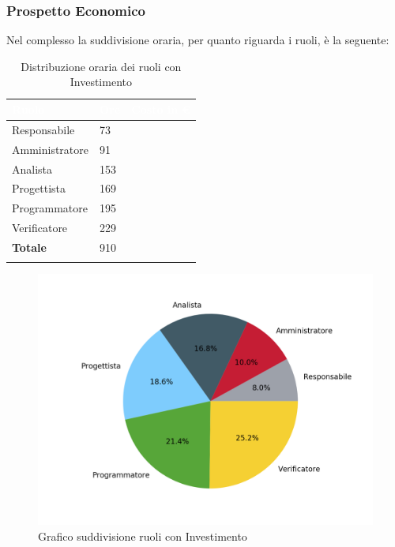 \newpage

\subsubsection{Prospetto Economico}
Nel complesso la suddivisione oraria, per quanto riguarda i ruoli, è la seguente: 


\begin{longtable}{| C{.30\textwidth}| C{.15\textwidth}| C{.20\textwidth}|}
\hline
{}\textbf{\textcolor{white}{Ruolo}} & \textbf{\textcolor{white}{Ore}} & \textbf{\textcolor{white}{Costo in \euro}} \\
\hline \hline
\endhead
Responsabile & 73 & \\
\hline
{}Amministratore & 91 &  \\
\hline
Analista & 153 &  \\
\hline 
{}Progettista & 169 & \\
\hline
Programmatore & 195 &  \\
\hline
{}Verificatore & 229 &  \\
\hline
\textbf{Totale} & 910 &  \\
\hline
\caption{Distribuzione oraria dei ruoli con Investimento}
\label{Distribuzione oraria ruoli con investimento}
\end{longtable}

\begin{figure}[H]
	\centering
  		\includegraphics[width=1\linewidth]{./images/torta_toci.png}
  		\caption{Grafico suddivisione ruoli con Investimento}
  		\label{fig:grafico suddivione ruoli con investimento}
\end{figure}



